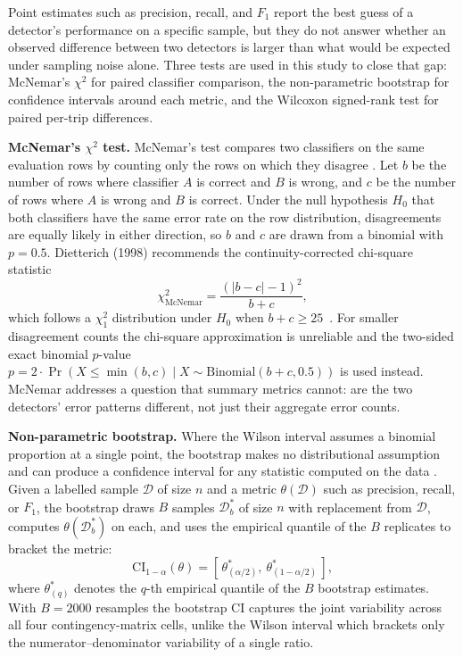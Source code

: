 Point estimates such as precision, recall, and $F_1$ report the best guess of a detector's performance on a specific sample, but they do not answer whether an observed difference between two detectors is larger than what would be expected under sampling noise alone. Three tests are used in this study to close that gap: McNemar's $\chi^2$ for paired classifier comparison, the non-parametric bootstrap for confidence intervals around each metric, and the Wilcoxon signed-rank test for paired per-trip differences.

\textbf{McNemar's $\chi^2$ test.} McNemar's test compares two classifiers on the same evaluation rows by counting only the rows on which they disagree \cite{mcnemar1947note}. Let $b$ be the number of rows where classifier $A$ is correct and $B$ is wrong, and $c$ be the number of rows where $A$ is wrong and $B$ is correct. Under the null hypothesis $H_0$ that both classifiers have the same error rate on the row distribution, disagreements are equally likely in either direction, so $b$ and $c$ are drawn from a binomial with $p = 0.5$. Dietterich (1998) recommends the continuity-corrected chi-square statistic
\begin{equation}
\chi^{2}_{\mathrm{McNemar}} = \frac{(|b - c| - 1)^{2}}{b + c},
\label{eq:mcnemar-ch3}
\end{equation}
which follows a $\chi^{2}_{1}$ distribution under $H_0$ when $b + c \geq 25$~\cite{dietterich1998approximate}. For smaller disagreement counts the chi-square approximation is unreliable and the two-sided exact binomial $p$-value $p = 2 \cdot \Pr(X \leq \min(b, c) \mid X \sim \mathrm{Binomial}(b + c, 0.5))$ is used instead. McNemar addresses a question that summary metrics cannot: are the two detectors' error patterns different, not just their aggregate error counts.

\textbf{Non-parametric bootstrap.} Where the Wilson interval assumes a binomial proportion at a single point, the bootstrap makes no distributional assumption and can produce a confidence interval for any statistic computed on the data \cite{efron1994bootstrap}. Given a labelled sample $\mathcal{D}$ of size $n$ and a metric $\theta(\mathcal{D})$ such as precision, recall, or $F_1$, the bootstrap draws $B$ samples $\mathcal{D}^{*}_{b}$ of size $n$ with replacement from $\mathcal{D}$, computes $\theta(\mathcal{D}^{*}_{b})$ on each, and uses the empirical quantile of the $B$ replicates to bracket the metric:
\begin{equation}
\mathrm{CI}_{1 - \alpha}(\theta) = \left[\, \theta^{*}_{(\alpha/2)},\ \theta^{*}_{(1 - \alpha/2)} \,\right],
\label{eq:bootstrap-ci-ch3}
\end{equation}
where $\theta^{*}_{(q)}$ denotes the $q$-th empirical quantile of the $B$ bootstrap estimates. With $B = 2000$ resamples the bootstrap CI captures the joint variability across all four contingency-matrix cells, unlike the Wilson interval which brackets only the numerator--denominator variability of a single ratio.

